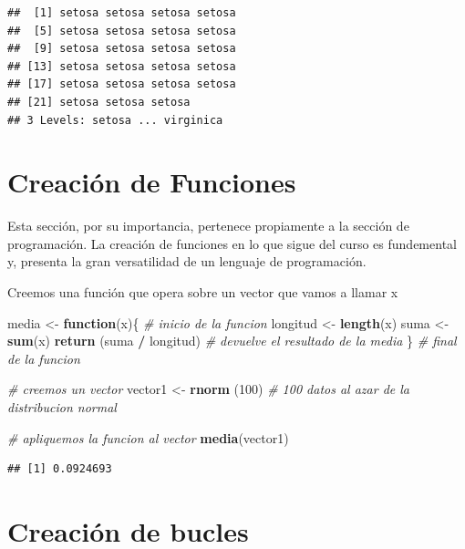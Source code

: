 \documentclass[
]{book}
\newenvironment{Shaded}{\begin{snugshade}}{\end{snugshade}}
\newcommand{\CommentTok}[1]{\textcolor[rgb]{0.56,0.35,0.01}{\textit{#1}}}
\newcommand{\ControlFlowTok}[1]{\textcolor[rgb]{0.13,0.29,0.53}{\textbf{#1}}}
\newcommand{\DecValTok}[1]{\textcolor[rgb]{0.00,0.00,0.81}{#1}}
\newcommand{\KeywordTok}[1]{\textcolor[rgb]{0.13,0.29,0.53}{\textbf{#1}}}
\newcommand{\NormalTok}[1]{#1}
\newcommand{\OperatorTok}[1]{\textcolor[rgb]{0.81,0.36,0.00}{\textbf{#1}}}
\newcommand{\StringTok}[1]{\textcolor[rgb]{0.31,0.60,0.02}{#1}}
\begin{document}
\begin{verbatim}
##  [1] setosa setosa setosa setosa
##  [5] setosa setosa setosa setosa
##  [9] setosa setosa setosa setosa
## [13] setosa setosa setosa setosa
## [17] setosa setosa setosa setosa
## [21] setosa setosa setosa
## 3 Levels: setosa ... virginica
\end{verbatim}

\hypertarget{creaciuxf3n-de-funciones}{%
\chapter{Creación de Funciones}\label{creaciuxf3n-de-funciones}}

Esta sección, por su importancia, pertenece propiamente a la sección de programación. La creación de funciones en lo que sigue del curso es fundemental y, presenta la gran versatilidad de un lenguaje de programación.

Creemos una función que opera sobre un vector que vamos a llamar x

\begin{Shaded}
\begin{Highlighting}[]
\NormalTok{media <-}\StringTok{ }\ControlFlowTok{function}\NormalTok{(x)\{     }\CommentTok{# inicio de la funcion}
\NormalTok{ longitud <-}\StringTok{ }\KeywordTok{length}\NormalTok{(x)}
\NormalTok{ suma <-}\StringTok{ }\KeywordTok{sum}\NormalTok{(x)}
 \KeywordTok{return}\NormalTok{ (suma }\OperatorTok{/}\StringTok{ }\NormalTok{longitud) }\CommentTok{# devuelve el resultado de la media}
\NormalTok{\}                         }\CommentTok{# final de la funcion}


\CommentTok{# creemos un vector}
\NormalTok{vector1 <-}\StringTok{ }\KeywordTok{rnorm}\NormalTok{ (}\DecValTok{100}\NormalTok{) }\CommentTok{# 100 datos al azar de la distribucion normal}

\CommentTok{# apliquemos la funcion al vector}
\KeywordTok{media}\NormalTok{(vector1)}
\end{Highlighting}
\end{Shaded}

\begin{verbatim}
## [1] 0.0924693
\end{verbatim}

\hypertarget{creaciuxf3n-de-bucles}{%
\chapter{Creación de bucles}\label{creaciuxf3n-de-bucles}}
\end{document}

